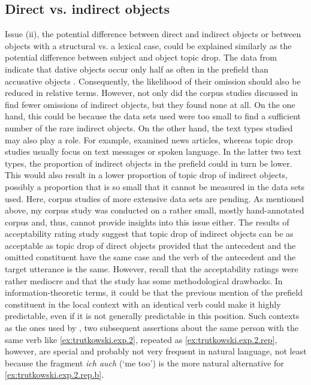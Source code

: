 \subsection{Direct vs. indirect objects}
Issue (ii), the potential difference between direct and indirect objects or between objects with a structural vs. a lexical case,  could be explained similarly as the potential difference between subject and object topic drop.
The data from \citet{bader.haeussler2010} indicate that dative  objects occur only half as often in the prefield than accusative objects . 
Consequently, the likelihood of their omission should also be reduced in relative terms.
However, not only did the corpus studies discussed in  find fewer omissions of indirect objects, but they found none at all.
On the one hand, this could be because the data sets used were too small to find a sufficient number of the rare indirect objects.
On the other hand, the text types studied may also play a role.
For example,  examined news articles, whereas topic drop studies usually focus on text messages or spoken language.
In the latter two text types,  the proportion of indirect objects in the prefield could in turn be lower. 
This would also result in a lower proportion of topic drop of indirect objects, possibly a proportion that is so small that it cannot be measured in the data sets used.
Here, corpus studies of more extensive data sets are pending.
As mentioned above, my corpus  study was conducted on a rather small, mostly hand-annotated corpus and, thus, cannot provide insights into this issue either.
The results of  acceptability rating study suggest that topic drop of indirect objects can be as acceptable as topic drop of direct objects provided that the antecedent and the omitted constituent have the same case and the verb of the antecedent and the target utterance is the same. 
However, recall that the acceptability ratings were rather mediocre and that the study has some methodological drawbacks.
In information-theoretic terms, it could be that the previous mention of the prefield constituent in the local context with an identical verb could make it highly predictable, even if it is not generally predictable in this position. 
Such contexts as the ones used by \citet{trutkowski2018}, two subsequent assertions about the same person with the same verb like \ref{ex:trutkowski.exp.2}, repeated as \ref{ex:trutkowski.exp.2.rep}, however, are special and probably not very frequent in natural language, not least because the fragment  \textit{ich auch} (`me too') is the more natural alternative for \ref{ex:trutkowski.exp.2.rep.b}.


